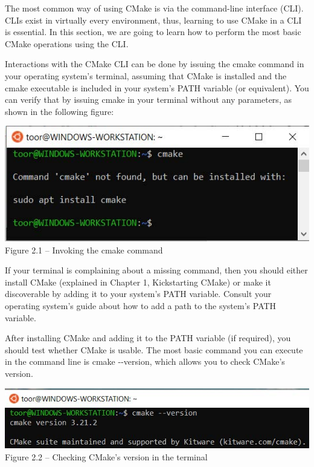 
The most common way of using CMake is via the command-line interface (CLI). CLIs exist in virtually every environment, thus, learning to use CMake in a CLI is essential. In this section, we are going to learn how to perform the most basic CMake operations using the CLI.

Interactions with the CMake CLI can be done by issuing the cmake command in your operating system's terminal, assuming that CMake is installed and the cmake executable is included in your system's PATH variable (or equivalent). You can verify that by issuing cmake in your terminal without any parameters, as shown in the following figure:

\begin{center}
\includegraphics[width=1.\textwidth]{content/1/chapter2/images/1.jpg}\\
Figure 2.1 – Invoking the cmake command
\end{center}

If your terminal is complaining about a missing command, then you should either install CMake (explained in Chapter 1, Kickstarting CMake) or make it discoverable by adding it to your system's PATH variable. Consult your operating system's guide about how to add a path to the system's PATH variable.

After installing CMake and adding it to the PATH variable (if required), you should test whether CMake is usable. The most basic command you can execute in the command line is cmake -{}-version, which allows you to check CMake's version.

\begin{center}
\includegraphics[width=1.\textwidth]{content/1/chapter2/images/2.jpg}\\
Figure 2.2 – Checking CMake's version in the terminal
\end{center}

